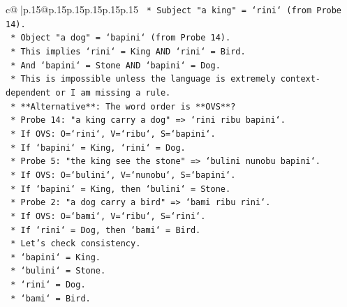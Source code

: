 \documentclass{article}
\begin{document}
{\begin{supertabular}{c@{$\;$}|p{.15\linewidth}@{}p{.15\linewidth}p{.15\linewidth}p{.15\linewidth}p{.15\linewidth}p{.15\linewidth}}
{{{\texttt{                                *   Subject "a king" = `rini` (from Probe 14).} \\
\texttt{                                *   Object "a dog" = `bapini` (from Probe 14).} \\
\texttt{                                *   This implies `rini` = King AND `rini` = Bird.} \\
\texttt{                                *   And `bapini` = Stone AND `bapini` = Dog.} \\
\texttt{                                *   This is impossible unless the language is extremely context{-}dependent or I am missing a rule.} \\
\texttt{                                *   **Alternative**: The word order is **OVS**?} \\
\texttt{                                    *   Probe 14: "a king carry a dog" => `rini ribu bapini`.} \\
\texttt{                                    *   If OVS: O=`rini`, V=`ribu`, S=`bapini`.} \\
\texttt{                                    *   If `bapini` = King, `rini` = Dog.} \\
\texttt{                                    *   Probe 5: "the king see the stone" => `bulini nunobu bapini`.} \\
\texttt{                                    *   If OVS: O=`bulini`, V=`nunobu`, S=`bapini`.} \\
\texttt{                                    *   If `bapini` = King, then `bulini` = Stone.} \\
\texttt{                                    *   Probe 2: "a dog carry a bird" => `bami ribu rini`.} \\
\texttt{                                    *   If OVS: O=`bami`, V=`ribu`, S=`rini`.} \\
\texttt{                                    *   If `rini` = Dog, then `bami` = Bird.} \\
\texttt{                                    *   Let's check consistency.} \\
\texttt{                                        *   `bapini` = King.} \\
\texttt{                                        *   `bulini` = Stone.} \\
\texttt{                                        *   `rini` = Dog.} \\
\texttt{                                        *   `bami` = Bird.} \\
}}}
\end{supertabular}}
\end{document}
